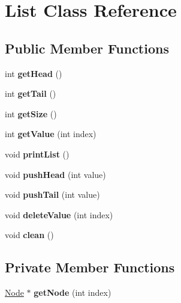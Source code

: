 \hypertarget{class_list}{}\section{List Class Reference}
\label{class_list}
\subsection*{Public Member Functions}
\begin{DoxyCompactItemize}
\item 
\mbox{\label{class_list_ac9148b518bd8355439b762674d703916}} 
int {\bfseries get\+Head} ()
\item 
\mbox{\label{class_list_aa058600e1c042eca78ea8dd6f51addee}} 
int {\bfseries get\+Tail} ()
\item 
\mbox{\label{class_list_a4dc0be43de595d393c22aad3248df0d8}} 
int {\bfseries get\+Size} ()
\item 
\mbox{\label{class_list_a6d2480efdcb3fbf93506a4cad0671dca}} 
int {\bfseries get\+Value} (int index)
\item 
\mbox{\label{class_list_a1bb66c2777061ab3b8260746a8c3961e}} 
void {\bfseries print\+List} ()
\item 
\mbox{\label{class_list_a01afe2dc1c85033cc9e6181e970f4f63}} 
void {\bfseries push\+Head} (int value)
\item 
\mbox{\label{class_list_a897ef562c15688b26603fe6f9936b0ac}} 
void {\bfseries push\+Tail} (int value)
\item 
\mbox{\label{class_list_aa51380f643a1243a369089db62681717}} 
void {\bfseries delete\+Value} (int index)
\item 
\mbox{\label{class_list_ae21d9988272942bd9a7d8013737ac747}} 
void {\bfseries clean} ()
\end{DoxyCompactItemize}
\subsection*{Private Member Functions}
\begin{DoxyCompactItemize}
\item 
\mbox{\label{class_list_a49b9395ac25b999f1027f8f349e099aa}} 
\mbox{\hyperlink{class_node}{Node}} $\ast$ {\bfseries get\+Node} (int index)
\end{DoxyCompactItemize}
